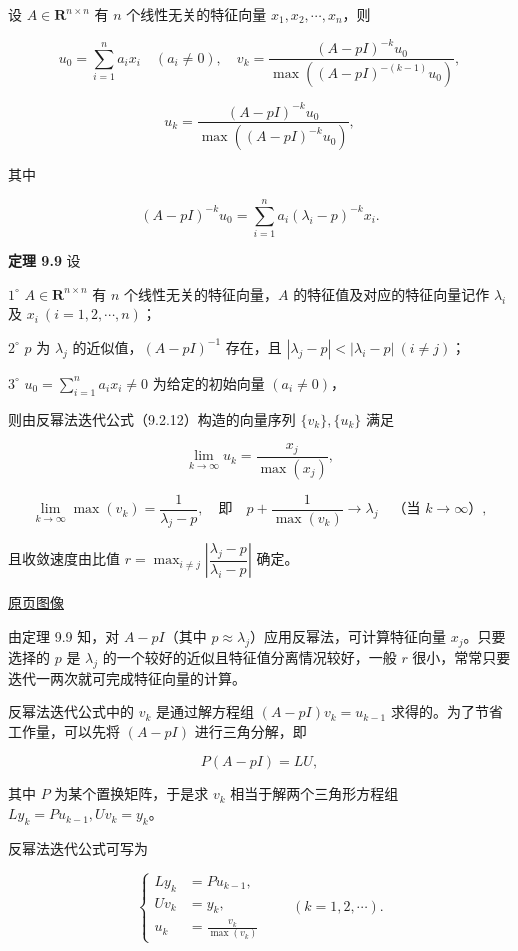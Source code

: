 \documentclass[
  10pt,
  fontset=fandol]{ctexart}
\begin{document}
设 \(A\in\mathbf R^{n\times n}\) 有 \(n\) 个线性无关的特征向量 \(x_1,x_2,\cdots,x_n\)，则

\[
u_0=\sum_{i=1}^na_ix_i\quad(a_i\ne0),\quad
v_k=\frac{(A-pI)^{-k}u_0}{\max((A-pI)^{-(k-1)}u_0)},
\]

\[
u_k=\frac{(A-pI)^{-k}u_0}{\max((A-pI)^{-k}u_0)},
\]

其中

\[
(A-pI)^{-k}u_0=\sum_{i=1}^na_i(\lambda_i-p)^{-k}x_i.
\]

\textbf{定理 9.9} 设

\(1^\circ\) \(A\in\mathbf R^{n\times n}\) 有 \(n\) 个线性无关的特征向量，\(A\) 的特征值及对应的特征向量记作 \(\lambda_i\) 及 \(x_i\ (i=1,2,\cdots,n)\)；

\(2^\circ\) \(p\) 为 \(\lambda_j\) 的近似值，\((A-pI)^{-1}\) 存在，且 \(|\lambda_j-p|<|\lambda_i-p|\ (i\ne j)\)；

\(3^\circ\) \(u_0=\displaystyle\sum_{i=1}^na_ix_i\ne0\) 为给定的初始向量 \((a_i\ne0)\)，

则由反幂法迭代公式（9.2.12）构造的向量序列 \(\{v_k\},\{u_k\}\) 满足

\[
\lim_{k\to\infty}u_k=\frac{x_j}{\max(x_j)},
\]

\[
\lim_{k\to\infty}\max(v_k)=\frac1{\lambda_j-p},\quad\text{即}\quad p+\frac1{\max(v_k)}\to\lambda_j\quad\text{（当 }k\to\infty\text{）},
\]

且收敛速度由比值 \(r=\displaystyle\max_{i\ne j}\left|\dfrac{\lambda_j-p}{\lambda_i-p}\right|\) 确定。

\href{../../source-images/pdf-242.jpeg}{原页图像}

由定理 9.9 知，对 \(A-pI\)（其中 \(p\approx\lambda_j\)）应用反幂法，可计算特征向量 \(x_j\)。只要选择的 \(p\) 是 \(\lambda_j\) 的一个较好的近似且特征值分离情况较好，一般 \(r\) 很小，常常只要迭代一两次就可完成特征向量的计算。

反幂法迭代公式中的 \(v_k\) 是通过解方程组 \((A-pI)v_k=u_{k-1}\) 求得的。为了节省工作量，可以先将 \((A-pI)\) 进行三角分解，即

\[
P(A-pI)=LU,
\]

其中 \(P\) 为某个置换矩阵，于是求 \(v_k\) 相当于解两个三角形方程组 \(Ly_k=Pu_{k-1},Uv_k=y_k\)。

反幂法迭代公式可写为

\[
\left\{
\begin{aligned}
Ly_k&=Pu_{k-1},\\
Uv_k&=y_k,\\
u_k&=\frac{v_k}{\max(v_k)}
\end{aligned}
\right.\qquad(k=1,2,\cdots).
\tag{9.2.13}
\]
\end{document}
